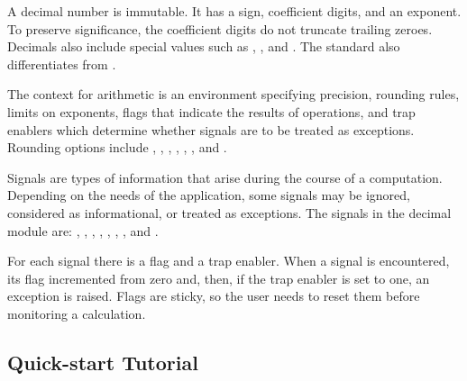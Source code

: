 A decimal number is immutable.  It has a sign, coefficient digits, and an
exponent.  To preserve significance, the coefficient digits do not truncate
trailing zeroes.  Decimals also include special values such as
, , and .  The standard
also differentiates  from .
                                                   
The context for arithmetic is an environment specifying precision, rounding
rules, limits on exponents, flags that indicate the results of operations,
and trap enablers which determine whether signals are to be treated as
exceptions.  Rounding options include ,
, , ,
, , and .

Signals are types of information that arise during the course of a
computation.  Depending on the needs of the application, some signals may be
ignored, considered as informational, or treated as exceptions. The signals in
the decimal module are: , ,
, , ,
, , and .

For each signal there is a flag and a trap enabler.  When a signal is
encountered, its flag incremented from zero and, then, if the trap enabler
is set to one, an exception is raised.  Flags are sticky, so the user
needs to reset them before monitoring a calculation.


\begin{seealso}

\end{seealso}



\subsection{Quick-start Tutorial \label{decimal-tutorial}}

